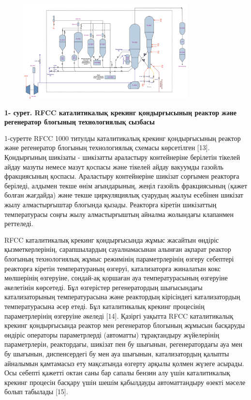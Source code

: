 \begin{figure}[H]
	\centering
	\includegraphics[width=0.8\textwidth]{media/ict/image86}
	\caption*{}
\end{figure}


{\bfseries 1- сурет. RFCC каталитикалық крекинг қондырғысының реактор және
регенератор блогының технологиялық сызбасы}

1-суретте RFCC 1000 титулды каталитикалық крекинг қондырғысының реактор
және регенератор блогының технологиялық схемасы көрсетілген {[}13{]}.
Қондырғының шикізаты - шикізатты араластыру контейнеріне берілетін
тікелей айдау мазуты немесе мазут қоспасы және тікелей айдау вакуумды
газойль фракциясының қоспасы. Араластыру контейнеріне шикізат сорғымен
реакторға беріледі, алдымен текше өнім ағындарының, жеңіл газойль
фракциясының (қажет болған жағдайда) және текше циркуляциялық суарудың
жылуы есебінен шикізат жылу алмастырғыштар блогында қызады. Реакторға
кіретін шикізаттың температурасы соңғы жылу алмастырғыштың айналма
жолындағы клапанмен реттеледі.

RFCC каталитикалық крекинг қондырғысында жұмыс жасайтын өндіріс
қызметкерлерінің, сарапшылардың сауалнамасынан алынған ақпарат реактор
блогының технологиялық жұмыс режимінің параметрлерінің өзгеру себептері
реакторға кіретін температураның өзгеруі, катализаторға жиналатын кокс
мөлшерінің өзгеруіне, сондай-ақ қоршаған ауа температурасының өзгеруіне
әкелетінін көрсетеді. Бұл өзгерістер регенератордың шығысындағы
катализаторының температурасына және реактордың кірісіндегі
катализатордың температурасына әсер етеді. Бұл каталитикалық крекинг
процесінің параметрлерінің өзгеруіне әкеледі {[}14{]}. Қазіргі уақытта
RFCC каталитикалық крекинг қондырғысында реактор мен регенератор
блогының жұмысын басқаруды өндіріс операторы параметрлерді (автоматты)
тұрақтандыру жүйелерінің параметрлерін, реактордағы, шикізат пен бу
шығынын, регенератордағы ауа мен бу шығынын, диспенсердегі бу мен ауа
шығынын, катализатордың қалыпты айналымын қамтамасыз ету мақсатында
өзгерту арқылы қолмен жүзеге асырады. Осы себепті қажетті октан саны бар
сапалы бензин алу үшін каталитикалық крекинг процесін басқару үшін шешім
қабылдауды автоматтандыру өзекті мәселе болып табылады {[}15{]}.

